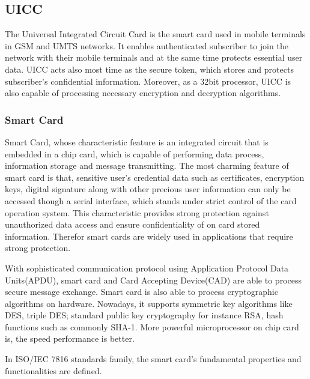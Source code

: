 \documentclass[]{llncs}
\begin{document}
\subsection{UICC}
The Universal Integrated Circuit Card is the smart card used in mobile terminals in GSM and UMTS networks. It enables authenticated subscriber to join the network with their mobile terminals and at the same time protects essential user data. UICC acts  also most time as the secure token, which stores and protects subscriber's confidential information. Moreover, as a 32bit processor, UICC is also capable of processing necessary  encryption and  decryption algorithms\cite{uiccDef}.

\subsubsection{Smart Card}
Smart Card, whose characteristic feature is an integrated circuit that is embedded in a chip card, which is capable of performing data process, information storage and message transmitting\cite{handbuch}. The most charming feature of smart card is that, sensitive user's credential data such as certificates, encryption keys, digital signature along with other precious user information can only be accessed though a serial interface, which stands under  strict control of the card operation system. This characteristic provides strong  protection against  unauthorized data access and ensure confidentiality of on card stored information. Therefor smart cards are widely used in applications that require strong protection.

With sophisticated communication protocol using Application Protocol Data Units(APDU), smart card and Card Accepting Device(CAD) are able to process secure message exchange. Smart card is also able to process cryptographic algorithms on hardware. Nowadays, it supports symmetric key algorithms like DES, triple DES; standard public key cryptography for instance RSA, hash functions such as commonly SHA-1\cite{handbuch}. More powerful microprocessor on chip card is, the speed performance is better.  

In ISO/IEC 7816 standards family,  the smart card's fundamental properties and functionalities are defined.
\end{document}
